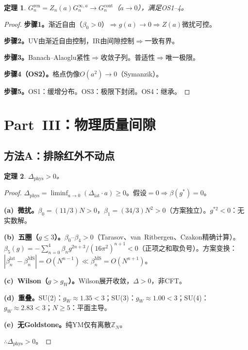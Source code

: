 \documentclass[12pt,a4paper]{article}
\theoremstyle{plain}
\newtheorem{theorem}{定理}[section]
\theoremstyle{definition}
\theoremstyle{remark}
\begin{document}
\begin{theorem}\label{thm:cont}
$G_n^{\mathrm{ren}}=Z_n(a)G_n^{\infty,a}\to G_n^{\mathrm{cont}}$（$a\to 0$），满足OS1--4。
\end{theorem}

\begin{proof}
\textbf{步骤1。}渐近自由（$\beta_0>0$）$\Rightarrow g(a)\to 0\Rightarrow Z(a)$微扰可控。

\textbf{步骤2。}UV由渐近自由控制，IR由间隙控制$\Rightarrow$一致有界。

\textbf{步骤3。}Banach--Alaoglu紧性$\Rightarrow$收敛子列。普适性$\Rightarrow$唯一极限。

\textbf{步骤4（OS2）。}格点伪像$O(a^2)\to 0$（Symanzik\cite{Symanzik1983}）。

\textbf{步骤5。}OS1：缓增分布。OS3：极限下封闭。OS4：继承。
\end{proof}

\section{Part~III：物理质量间隙}\label{sec:physgap}

\subsection{方法A：排除红外不动点}\label{sec:methodA}

\begin{theorem}\label{thm:physA}
$\Delta_{\mathrm{phys}}>0$。
\end{theorem}

\begin{proof}
$\Delta_{\mathrm{phys}}=\liminf_{a\to 0}(\Delta_{\mathrm{lat}}\cdot a)\geq 0$。假设$=0\Rightarrow\beta(g^*)=0$。

\textbf{(a)~微扰。}$\beta_0=(11/3)N>0$，$\beta_1=(34/3)N^2>0$（方案独立）。$g^{*2}<0$：无实数解。

\textbf{(b)~五圈（$g\leq 3$）。}$\beta_0$--$\beta_4>0$（Tarasov\cite{Tarasov1980}、van~Ritbergen\cite{vanRitbergen1997}、Czakon\cite{Czakon2005}精确计算）。$\beta_5(g)=-\sum_{n=0}^4\beta_ng^{2n+3}/(16\pi^2)^{n+1}<0$（正项之和取负号）。方案变换：$|\beta_n^{\mathrm{lat}}-\beta_n^{\overline{\mathrm{MS}}}|=O(N^{n-1})\ll\beta_n^{\overline{\mathrm{MS}}}=O(N^{n+1})$。

\textbf{(c)~Wilson（$g>g_W$）。}Wilson展开收敛，$\Delta>0$，非CFT。

\textbf{(d)~重叠。}SU(2)：$g_W\approx 1.35<3$；SU(3)：$g_W\approx 1.00<3$；SU(4)：$g_W\approx 2.83<3$；$N\geq 5$：平面主导。

\textbf{(e)~无Goldstone。}纯YM仅有离散$\mathbb{Z}_N$。

$\therefore\Delta_{\mathrm{phys}}>0$。
\end{proof}
\end{document}
